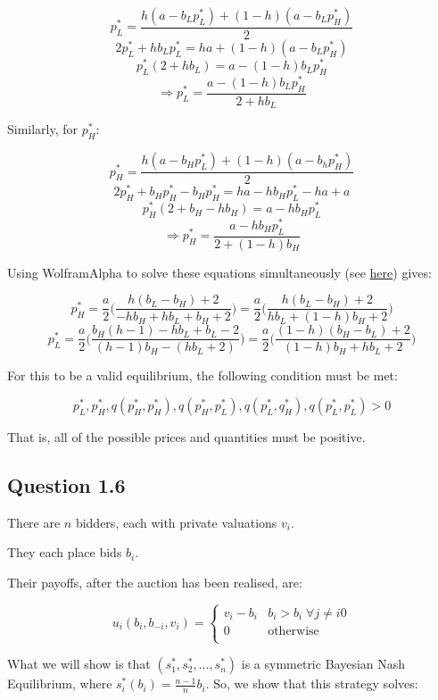 \documentclass[11pt,a4paper]{article}
\begin{document}
$$p_L^* = \frac{h(a-b_L p_L^*)+(1-h)(a-b_Lp_H^*)}{2}$$
$$2p_L^* + hb_Lp_L^* = ha+(1-h)(a-b_Lp_H^*)$$
$$p_L^*(2+hb_L) = a-(1-h)b_Lp_H^*$$
$$ \Rightarrow p_L^* = \frac{a-(1-h)b_Lp_H^*}{2+hb_L} $$

Similarly, for $p_H^*$:

$$p_H^* = \frac{h(a-b_Hp_L^*)+(1-h)(a-b_hp_H^*)}{2} $$
$$ 2p_H^* +b_Hp_H^* - b_Hp_H^* = ha-hb_Hp_L^*-ha+a$$
$$ p_H^*(2+b_H-hb_H) = a - hb_Hp_L^* $$
$$ \Rightarrow p_H^* = \frac{a-hb_Hp_L^*}{2+(1-h)b_H} $$

Using WolframAlpha to solve these equations simultaneously (see \href{https://bit.ly/2TFDSfE}{here}) gives:

$$p_H^* = \frac{a}{2}\Big( \frac{h(b_L-b_H)+2}{-hb_H+hb_L+b_H+2} \Big) = \frac{a}{2} \Big( \frac{h(b_L-b_H)+2}{hb_L+(1-h)b_H+2} \Big)$$
$$p_L^* = \frac{a}{2}\Big( \frac{b_H(h-1)-hb_L+b_L-2}{(h-1)b_H-(hb_L+2)} \Big) = \frac{a}{2}\Big( \frac{(1-h)(b_H-b_L)+2}{(1-h)b_H +hb_L + 2} \Big)$$

For this to be a valid equilibrium, the following condition must be met:

$$p_L^*, p_H^*, q(p_H^*, p_H^*), q(p_H^*,p_L^*), q(p_L^*, q_H^*), q(p_L^*, p_L^*) > 0$$

That is, all of the possible prices and quantities must be positive. 

\subsection*{Question 1.6}

There are $n$ bidders, each with private valuations $v_i$.

They each place bids $b_i$.

Their payoffs, after the auction has been realised, are:

$$u_i(b_i,b_{-i}, v_i) =  \begin{cases} 
      v_i-b_i & b_i>b_i \; \forall j \neq i 0 \\
      0 & \text{otherwise} \\
   \end{cases}
$$

What we will show is that $(s_1^*, s_2^*, ..., s_n^*)$ is a symmetric Bayesian Nash Equilibrium, where $s_i^*(b_i) = \frac{n-1}{n}b_i$. So, we show that this strategy solves:
\end{document}

